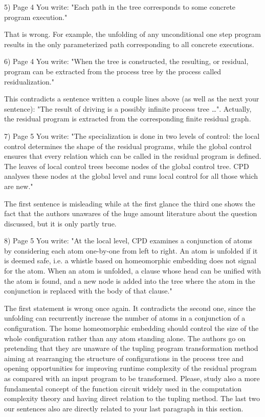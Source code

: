 5) Page 4
You write: "Each path in the tree corresponds to some concrete program execution."

That is wrong. For example, the unfolding of any unconditional one step program results in the only parameterized path corresponding to all concrete executions.

6) Page 4
You write: "When the tree is constructed, the resulting, or residual, program can be extracted from the process tree by the process called residualization."

 This contradicts a sentence written a couple lines above (as well as the next your sentence): "The result of driving is a possibly infinite process tree …".  Actually, the residual program is extracted from the corresponding finite residual graph.


7) Page 5
You write: "The specialization is done in two levels of control: the local control determines the shape of the residual programs, while the global control ensures that every relation which can be called in the residual program is defined. The leaves of local control trees become nodes of the global control tree. CPD analyses these nodes at the global level and runs local control for all those which are new."

The first sentence is misleading while at the first glance the third one shows the fact that the authors unawares of the huge amount literature about the question discussed, but it is only partly true.


8) Page 5
You write: "At the local level, CPD examines a conjunction of atoms by considering each atom one-by-one from left to right. An atom is unfolded if it is deemed safe, i.e. a whistle based on homeomorphic embedding does not signal for the atom.
When an atom is unfolded, a clause whose head can be unified with the atom is found, and a new node is added into the tree where the atom in the conjunction is replaced with the body of that clause."

  The first statement is wrong once again. It contradicts the second one, since the unfolding can recurrently increase the number of atoms in a conjunction of a configuration.
  The home homeomorphic embedding should control the size of the whole configuration rather than any atom standing alone.
  The authors go on pretending that they are unaware of the tupling program transformation method aiming at rearranging the structure of configurations in the process tree and opening opportunities for improving runtime complexity of the residual program as compared with an input program to be transformed. Please, study also a more fundamental concept of the function circuit widely used in the computation complexity theory and having direct relation to the tupling method. The last two our sentences also are directly related to your last paragraph in this section.

